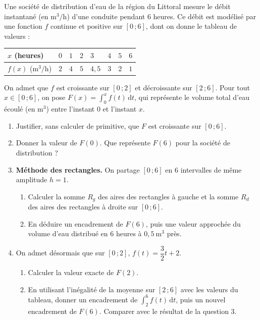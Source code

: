 \documentclass[11pt]{article}
\begin{document}
\begin{exercice}
Une société de distribution d'eau de la région du Littoral mesure le débit instantané (en $\mathrm{m}^3/\mathrm{h}$) d'une conduite pendant $6$ heures. Ce débit est modélisé par une fonction $f$ continue et positive sur $[0\,;6]$, dont on donne le tableau de valeurs :
\begin{center}
\begin{tabularx}{\linewidth}{|l|X|X|X|X|X|X|X|}
\hline
\rowcolor{popblueL}
$x$ (heures) & $0$ & $1$ & $2$ & $3$ & $4$ & $5$ & $6$ \\
\hline
$f(x)$ ($\mathrm{m}^3/\mathrm{h}$) & $2$ & $4$ & $5$ & $4{,}5$ & $3$ & $2$ & $1$ \\
\hline
\end{tabularx}
\end{center}
On admet que $f$ est croissante sur $[0\,;2]$ et décroissante sur $[2\,;6]$. Pour tout $x\in[0\,;6]$, on pose $F(x)=\displaystyle\int_0^x f(t)\,\mathrm{d}t$, qui représente le volume total d'eau écoulé (en $\mathrm{m}^3$) entre l'instant $0$ et l'instant $x$.
\begin{enumerate}
\item Justifier, sans calculer de primitive, que $F$ est croissante sur $[0\,;6]$.
\item Donner la valeur de $F(0)$. Que représente $F(6)$ pour la société de distribution ?
\item \textbf{Méthode des rectangles.} On partage $[0\,;6]$ en $6$ intervalles de même amplitude $h=1$.
\begin{enumerate}
\item Calculer la somme $R_g$ des aires des rectangles à gauche et la somme $R_d$ des aires des rectangles à droite sur $[0\,;6]$.
\item En déduire un encadrement de $F(6)$, puis une valeur approchée du volume d'eau distribué en $6$ heures à $0{,}5\ \mathrm{m}^3$ près.
\end{enumerate}
\item On admet désormais que sur $[0\,;2]$, $f(t)=\dfrac{3}{2}t+2$.
\begin{enumerate}
\item Calculer la valeur exacte de $F(2)$.
\item En utilisant l'inégalité de la moyenne sur $[2\,;6]$ avec les valeurs du tableau, donner un encadrement de $\displaystyle\int_2^6 f(t)\,\mathrm{d}t$, puis un nouvel encadrement de $F(6)$. Comparer avec le résultat de la question 3.
\end{enumerate}
\end{enumerate}
\end{exercice}
\end{document}
